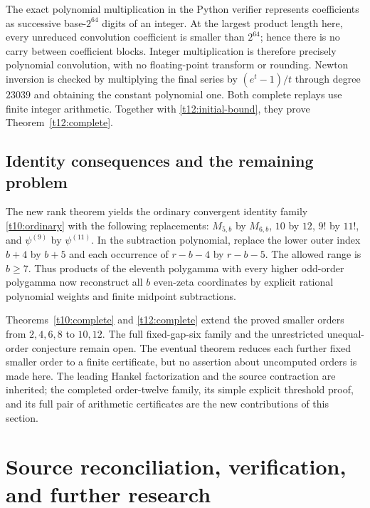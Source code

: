 \documentclass[11pt,letterpaper]{article}
\numberwithin{equation}{section}
\theoremstyle{definition}
\theoremstyle{remark}
\begin{document}
The exact polynomial multiplication in the Python verifier represents
coefficients as successive base-$2^{64}$ digits of an integer. At the
largest product length here, every unreduced convolution coefficient
is smaller than $2^{64}$; hence there is no carry between coefficient
blocks. Integer multiplication is therefore precisely polynomial
convolution, with no floating-point transform or rounding. Newton
inversion is checked by multiplying the final series by
$(e^t-1)/t$ through degree $23039$ and obtaining the constant polynomial
one. Both complete replays use finite integer arithmetic. Together
with \eqref{t12:initial-bound}, they prove
Theorem~\ref{t12:complete}.

\subsection{Identity consequences and the remaining problem}

The new rank theorem yields the ordinary convergent identity family
\eqref{t10:ordinary} with the following replacements:
$M_{5,b}$ by $M_{6,b}$, $10$ by $12$, $9!$ by $11!$, and
$\psi^{(9)}$ by $\psi^{(11)}$. In the subtraction polynomial,
replace the lower outer index $b+4$ by $b+5$ and each occurrence of
$r-b-4$ by $r-b-5$. The allowed range is $b\ge7$. Thus products
of the eleventh polygamma with every higher odd-order polygamma
now reconstruct all $b$ even-zeta coordinates by explicit rational
polynomial weights and finite midpoint subtractions.

Theorems~\ref{t10:complete} and \ref{t12:complete} extend the proved
smaller orders from $2,4,6,8$ to $10,12$. The full fixed-gap-six
family and the unrestricted unequal-order conjecture remain open.
The eventual theorem reduces each further fixed smaller order to a
finite certificate, but no assertion about uncomputed orders is made
here. The leading Hankel factorization and the source contraction
are inherited; the completed order-twelve family, its simple explicit
threshold proof, and its full pair of arithmetic certificates are the
new contributions of this section.



\section{Source reconciliation, verification, and further research}
\label{audit:section}
\end{document}

